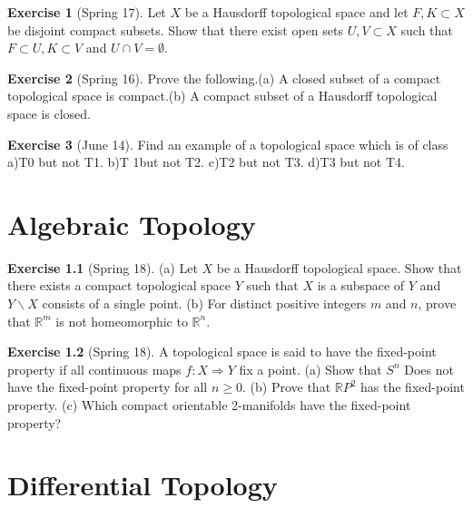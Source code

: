 \documentclass[12pt]{book}
\newcommand{\rr}{\mathbb{R}}
\theoremstyle{definition}
\newtheorem{ex}{Exercise}
\begin{document}
	\begin{ex}[Spring 17]
		Let $X$ be a Hausdorff topological space and let $F,K\subset X$ be disjoint
		 compact subsets.  Show that there exist open sets $U,V\subset X$ such
		  that $F\subset U,K\subset V$ and $U\cap V=\emptyset$.
	\end{ex}

	\begin{ex}[Spring 16]
		Prove the following.(a)  A closed subset of a compact topological space is compact.(b)  A compact subset of a Hausdorff topological space is closed.
	\end{ex}

	\begin{ex}[June 14]
		Find an example of a topological space which is of class a)T0 but not T1. b)T 1but not T2. c)T2 but not T3. d)T3 but not T4.
	\end{ex}
	\chapter{Algebraic Topology}
	\begin{ex}[Spring 18]
		(a) Let $X$ be a Hausdorff topological space. Show that there exists a compact topological space $Y$ such that $X$ is a subspace of $Y$ and $Y\backslash X$ consists of a single point. (b) For distinct positive integers $m$ and $n$, prove that $\rr^m$ is not homeomorphic to $\rr^n$.
	\end{ex}
	
	\begin{ex}[Spring 18]
		A topological space is said to have the fixed-point property if all continuous maps $f: X \Rightarrow Y$ fix a point. (a) Show that $S^n$ Does not have the fixed-point property for all $n\geq 0$. (b) Prove that $\rr P^2$ has the fixed-point property. (c) Which compact orientable 2-manifolds have the fixed-point property?
	\end{ex}
	\chapter{Differential Topology}
\end{document}
